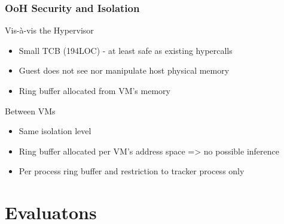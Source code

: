 \documentclass[xcolor=table,bigger,unknownkeysallowed]{beamer}
\begin{document}
\begin{frame}
	\frametitle{OoH Security and Isolation}	
	\begin{block}{Vis-à-vis the Hypervisor}		
		\begin{itemize}
			\item Small TCB\footnotemark{} (194LOC) - at least safe as existing hypercalls
			\item Guest does not see nor manipulate host physical memory
			\item Ring buffer allocated from VM's memory
		\end{itemize}
	\end{block}
	\pause
	\begin{block}{Between VMs}		
		\begin{itemize}
			\item Same isolation level 
			\item Ring buffer allocated per VM's address space => no possible inference
			\item Per process ring buffer and restriction to tracker process only
		\end{itemize}		
	\end{block}
\end{frame}     

\section{Evaluatons}
\end{document}
